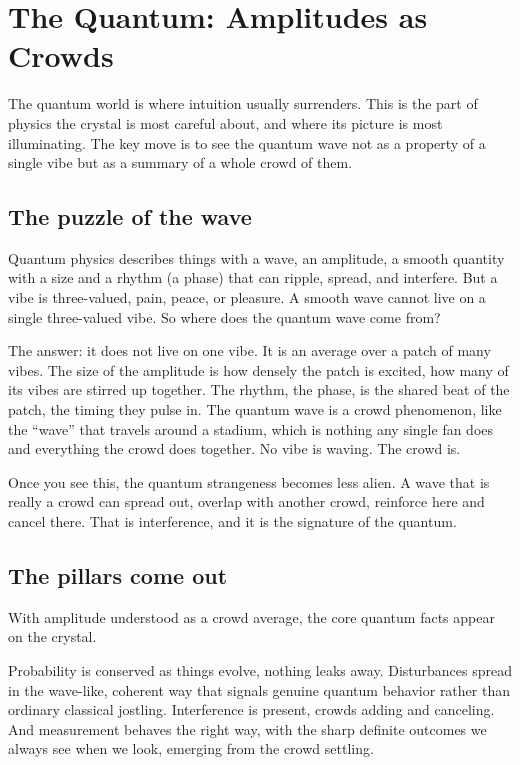 \section{The Quantum: Amplitudes as Crowds}

The quantum world is where intuition usually surrenders. This is the part of physics the crystal is most careful about, and where its picture is most illuminating. The key move is to see the quantum wave not as a property of a single vibe but as a summary of a whole crowd of them.

\subsection{The puzzle of the wave}

Quantum physics describes things with a wave, an amplitude, a smooth quantity with a size and a rhythm (a phase) that can ripple, spread, and interfere. But a vibe is three-valued, pain, peace, or pleasure. A smooth wave cannot live on a single three-valued vibe. So where does the quantum wave come from?

The answer: it does not live on one vibe. It is an average over a patch of many vibes. The size of the amplitude is how densely the patch is excited, how many of its vibes are stirred up together. The rhythm, the phase, is the shared beat of the patch, the timing they pulse in. The quantum wave is a crowd phenomenon, like the ``wave'' that travels around a stadium, which is nothing any single fan does and everything the crowd does together. No vibe is waving. The crowd is.

Once you see this, the quantum strangeness becomes less alien. A wave that is really a crowd can spread out, overlap with another crowd, reinforce here and cancel there. That is interference, and it is the signature of the quantum.

\subsection{The pillars come out}

With amplitude understood as a crowd average, the core quantum facts appear on the crystal.

Probability is conserved as things evolve, nothing leaks away. Disturbances spread in the wave-like, coherent way that signals genuine quantum behavior rather than ordinary classical jostling. Interference is present, crowds adding and canceling. And measurement behaves the right way, with the sharp definite outcomes we always see when we look, emerging from the crowd settling.

